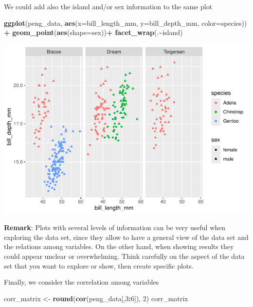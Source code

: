 \documentclass[
]{article}
\newenvironment{Shaded}{\begin{snugshade}}{\end{snugshade}}
\newcommand{\AttributeTok}[1]{\textcolor[rgb]{0.13,0.29,0.53}{#1}}
\newcommand{\DecValTok}[1]{\textcolor[rgb]{0.00,0.00,0.81}{#1}}
\newcommand{\FunctionTok}[1]{\textcolor[rgb]{0.13,0.29,0.53}{\textbf{#1}}}
\newcommand{\NormalTok}[1]{#1}
\newcommand{\OtherTok}[1]{\textcolor[rgb]{0.56,0.35,0.01}{#1}}
\newcommand{\SpecialCharTok}[1]{\textcolor[rgb]{0.81,0.36,0.00}{\textbf{#1}}}
\begin{document}
We could add also the island and/or sex information to the same plot

\begin{Shaded}
\begin{Highlighting}[]
\FunctionTok{ggplot}\NormalTok{(peng\_data, }\FunctionTok{aes}\NormalTok{(}\AttributeTok{x=}\NormalTok{bill\_length\_mm, }\AttributeTok{y=}\NormalTok{bill\_depth\_mm, }\AttributeTok{color=}\NormalTok{species)) }\SpecialCharTok{+}
  \FunctionTok{geom\_point}\NormalTok{(}\FunctionTok{aes}\NormalTok{(}\AttributeTok{shape=}\NormalTok{sex))}\SpecialCharTok{+}
  \FunctionTok{facet\_wrap}\NormalTok{(.}\SpecialCharTok{\textasciitilde{}}\NormalTok{island)}
\end{Highlighting}
\end{Shaded}

\includegraphics{EDA_files/figure-latex/unnamed-chunk-35-1.pdf}

\textbf{Remark}: Plots with several levels of information can be very
useful when exploring the data set, since they allow to have a general
view of the data set and the relations among variables. On the other
hand, when showing results they could appear unclear or overwhelming.
Think carefully on the aspect of the data set that you want to explore
or show, then create specific plots.

Finally, we consider the correlation among variables

\begin{Shaded}
\begin{Highlighting}[]
\NormalTok{corr\_matrix }\OtherTok{\textless{}{-}} \FunctionTok{round}\NormalTok{(}\FunctionTok{cor}\NormalTok{(peng\_data[,}\DecValTok{3}\SpecialCharTok{:}\DecValTok{6}\NormalTok{]), }\DecValTok{2}\NormalTok{)}
\NormalTok{corr\_matrix}
\end{Highlighting}
\end{Shaded}
\end{document}

